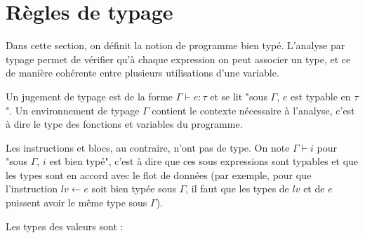 \begin{minipage}{0.5\textwidth}

\end{minipage}
\begin{minipage}{0.5\textwidth}
\end{minipage}

\section{Règles de typage}

Dans cette section, on définit la notion de programme bien typé. L'analyse par
typage permet de vérifier qu'à chaque expression on peut associer un type, et ce
de manière cohérente entre plusieurs utilisations d'une variable.

Un jugement de typage est de la forme $Γ ⊢ e : τ$ et se lit "sous $Γ$, $e$ est
typable en $τ$". Un environnement de typage $Γ$ contient le contexte nécessaire
à l'analyse, c'est à dire le type des fonctions et variables du programme.

Les instructions et blocs, au contraire, n'ont pas de type. On note $Γ ⊢ i$ pour
"sous $Γ$, $i$ est bien typé", c'est à dire que ces sous expressions sont
typables et que les types sont en accord avec le flot de données (par exemple,
pour que l'instruction $lv \leftarrow e$ soit bien typée sous $Γ$, il faut que les types
de $lv$ et de $e$ puissent avoir le même type sous $Γ$).

Les types des valeurs sont :


